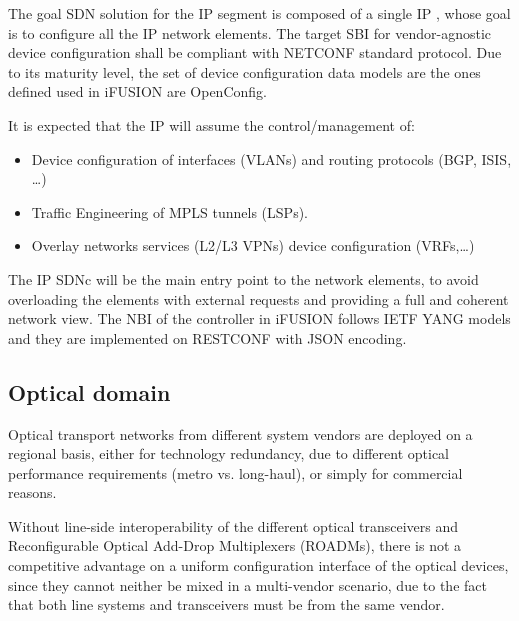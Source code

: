 \documentclass[10pt, conference]{IEEEtran}
\begin{document}
The goal SDN solution for the IP segment is composed of a single IP , whose goal is to configure all the IP network elements. The target SBI for vendor-agnostic device configuration shall be compliant with NETCONF standard protocol.  Due to its maturity level, the set of device configuration data models are the ones defined used in i\uppercase{FUSION} are OpenConfig.

It is expected that the IP  will assume the control/management of:
\begin{itemize}
\item Device configuration of interfaces (VLANs) and routing protocols (BGP, ISIS, …)
\item Traffic Engineering of MPLS tunnels (LSPs). 
\item Overlay networks services (L2/L3 VPNs) device configuration (VRFs,\dots)
\end{itemize}

The IP SDNc will be the main entry point to the network elements, to avoid overloading the elements with external requests and providing a  full and coherent network view. The NBI of the controller in i\uppercase{FUSION} follows IETF YANG models and they are implemented on RESTCONF with JSON encoding. 

\subsection{Optical domain}
\label{section:dwdm}
Optical transport networks from different system vendors are deployed on a regional basis, either for technology redundancy, due to different optical performance requirements (metro vs. long-haul), or simply for commercial reasons. 

Without line-side interoperability of the different optical transceivers and Reconfigurable Optical Add-Drop Multiplexers (ROADMs), there is not a competitive advantage on a uniform configuration interface of the optical devices, since they cannot neither be mixed in a multi-vendor scenario, due to the fact that both line systems and transceivers must be from the same vendor.
\end{document}
